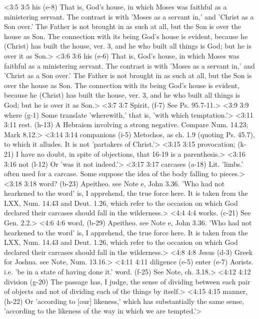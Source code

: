 <3:5 3:5  his (e-8)  That is, God's house, in which Moses was faithful as a  ministering servant. The contrast is with 'Moses as a servant  in,' and 'Christ as a Son over.' The Father is not brought in  as such at all, but the Son is over the house as Son. The  connection with its being God's house is evident, because he  (Christ) has built the house, ver. 3, and he who built all  things is God; but he is over it as Son.>
<3:6 3:6  his (e-6)  That is, God's house, in which Moses was faithful as a  ministering servant. The contrast is with 'Moses as a servant  in,' and 'Christ as a Son over.' The Father is not brought in  as such at all, but the Son is over the house as Son. The  connection with its being God's house is evident, because he  (Christ) has built the house, ver. 3, and he who built all  things is God; but he is over it as Son.>
<3:7 3:7  Spirit, (f-7)  See Ps. 95.7-11.>
<3:9 3:9  where (g-1)  Some translate 'wherewith,' that is, 'with which temptation.'>
<3:11 3:11  rest. (h-13)  A Hebraism involving a strong negative. Compare Num. 14.23;  Mark 8.12.>
<3:14 3:14  companions (i-5)  Metochos, as ch. 1.9 (quoting Ps. 45.7), to which it  alludes. It is not 'partakers of Christ.'>
<3:15 3:15  provocation; (k-21)  I have no doubt, in spite of objections, that 16-19 is a  parenthesis.>
<3:16 3:16  not (l-12)  Or 'was it not indeed.'>
<3:17 3:17  carcases (a-18)  Lit. 'limbs.' often used for a carcase. Some suppose the idea  of the body falling to pieces.>
<3:18 3:18  word? (b-23)  Apeitheo. see Note e, John 3.36. 'Who had not hearkened to  the word' is, I apprehend, the true force here. It is taken  from the LXX, Num. 14.43 and Deut. 1.26, which refer to the  occasion on which God declared their carcases should fall in  the wilderness.>
<4:4 4:4  works. (c-21)  See Gen. 2.2.>
<4:6 4:6  word, (b-29)  Apeitheo. see Note e, John 3.36. 'Who had not hearkened to  the word' is, I apprehend, the true force here. It is taken  from the LXX, Num. 14.43 and Deut. 1.26, which refer to the  occasion on which God declared their carcases should fall in  the wilderness.>
<4:8 4:8  Jesus (d-3)  Greek for Joshua. see Note, Num. 13.16.>
<4:11 4:11  diligence (e-5)  enter (e-7)
  Aorists. i.e. 'be in a state of having done it.'
  word. (f-25)  See Note, ch. 3.18.>
<4:12 4:12  division (g-20)  The passage has, I judge, the sense of dividing between each  pair of objects and not of dividing each of the things by  itself.>
<4:15 4:15  manner, (h-22)  Or 'according to [our] likeness,' which has substantially the  same sense, 'according to the likeness of the way in which we  are tempted.'>
